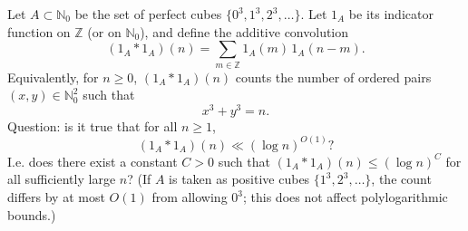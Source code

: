 Let $A\subset\mathbb{N}_0$ be the set of perfect cubes $\{0^3,1^3,2^3,\dots\}$. Let $1_A$ be its indicator function on $\mathbb{Z}$ (or on $\mathbb{N}_0$), and define the additive convolution
\[
(1_A*1_A)(n)=\sum_{m\in\mathbb{Z}} 1_A(m)\,1_A(n-m).
\]
Equivalently, for $n\ge 0$, $(1_A*1_A)(n)$ counts the number of ordered pairs $(x,y)\in\mathbb{N}_0^2$ such that
\[
 x^3+y^3=n.
\]
Question: is it true that for all $n\ge 1$,
\[
(1_A*1_A)(n) \ll (\log n)^{O(1)}?
\]
I.e. does there exist a constant $C>0$ such that $(1_A*1_A)(n)\le (\log n)^C$ for all sufficiently large $n$?
(If $A$ is taken as positive cubes $\{1^3,2^3,\dots\}$, the count differs by at most $O(1)$ from allowing $0^3$; this does not affect polylogarithmic bounds.)

